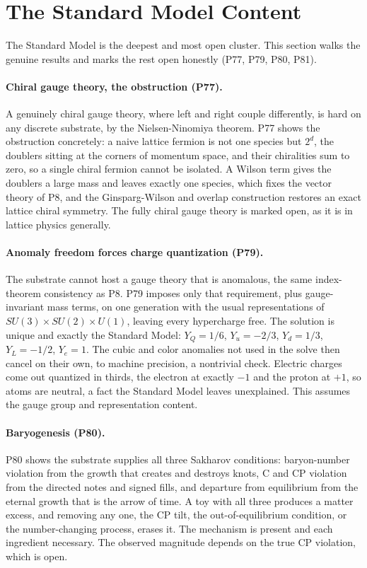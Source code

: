 \section{The Standard Model Content}
\label{sec:standardmodel}

The Standard Model is the deepest and most open cluster. This section walks the genuine results and
marks the rest open honestly (P77, P79, P80, P81).

\paragraph{Chiral gauge theory, the obstruction (P77).}
A genuinely chiral gauge theory, where left and right couple differently, is hard on any discrete
substrate, by the Nielsen-Ninomiya theorem. P77 shows the obstruction concretely: a naive lattice
fermion is not one species but $2^d$, the doublers sitting at the corners of momentum space, and
their chiralities sum to zero, so a single chiral fermion cannot be isolated. A Wilson term gives
the doublers a large mass and leaves exactly one species, which fixes the vector theory of P8, and
the Ginsparg-Wilson and overlap construction \citep{neuberger1998exactly} restores an exact lattice chiral
symmetry. The fully chiral gauge theory is marked open, as it is in lattice physics generally.

\paragraph{Anomaly freedom forces charge quantization (P79).}
The substrate cannot host a gauge theory that is anomalous, the same index-theorem consistency as
P8. P79 imposes only that requirement, plus gauge-invariant mass terms, on one generation with the
usual representations of $SU(3) \times SU(2) \times U(1)$, leaving every hypercharge free. The
solution is unique and exactly the Standard Model: $Y_Q = 1/6$, $Y_u = -2/3$, $Y_d = 1/3$,
$Y_L = -1/2$, $Y_e = 1$. The cubic and color anomalies not used in the solve then cancel on their
own, to machine precision, a nontrivial check. Electric charges come out quantized in thirds, the
electron at exactly $-1$ and the proton at $+1$, so atoms are neutral, a fact the Standard Model
leaves unexplained. This assumes the gauge group and representation content.

\paragraph{Baryogenesis (P80).}
P80 shows the substrate supplies all three Sakharov conditions: baryon-number violation from the
growth that creates and destroys knots, C and CP violation from the directed notes and signed fills,
and departure from equilibrium from the eternal growth that is the arrow of time. A toy with all
three produces a matter excess, and removing any one, the CP tilt, the out-of-equilibrium condition,
or the number-changing process, erases it. The mechanism is present and each ingredient necessary.
The observed magnitude depends on the true CP violation, which is open.

